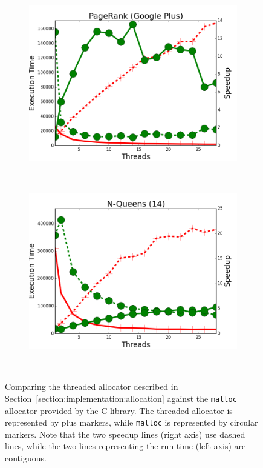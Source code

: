 \begin{figure}[h]
\begin{subfigure}[b]{\smallplotsize\textwidth}
                \includegraphics[width=\textwidth]{experiments/scalability/malloc-allocator-pagerank-gplus.png}
                \label{fig:implementation:malloc_pagerank}
        \end{subfigure}
        ~
        \begin{subfigure}[b]{\smallplotsize\textwidth}
                \includegraphics[width=\textwidth]{experiments/scalability/malloc-allocator-8queens-14.png}
                \label{fig:implementation:malloc_queens}
        \end{subfigure} \\

        \caption{Comparing the threaded allocator described in
           Section~\ref{section:implementation:allocation} against the
           \texttt{malloc} allocator provided by the C library. The threaded
           allocator is represented by plus markers, while \texttt{malloc} is
        represented by circular markers. Note that the two speedup lines (right
     axis) use dashed lines, while the two lines representing the run time (left
  axis) are contiguous.}

        \label{fig:implementation:malloc_results}
\end{figure}
